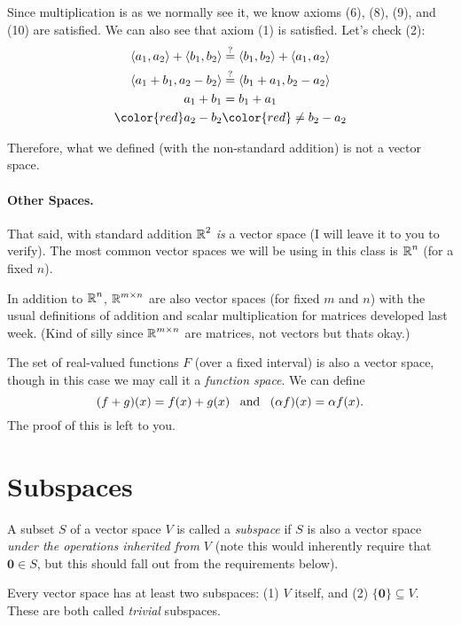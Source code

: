 Since multiplication is as we normally see it, we know axioms (6), (8), (9), and (10) are satisfied. 
We can also see that axiom (1) is satisfied.
Let's check (2): 
\[\begin{aligned}
\langle a_1,a_2\rangle + \langle b_1, b_2\rangle & \stackrel{?}{=}  \langle b_1, b_2\rangle + \langle a_1,a_2\rangle\\
\langle a_1+b_1, a_2-b_2\rangle & \stackrel{?}{=}  \langle b_1+a_1, b_2-a_2\rangle\\
a_1+b_1 & =  b_1+a_1\\
\color{red} a_2-b_2& \color{red}\ne  b_2-a_2\\
\end{aligned}\]

Therefore, what we defined (with the non-standard addition) is not a vector space. 


\paragraph{Other Spaces.} 
That said, with standard addition $\operatorname{\mathbb{R}}^2$ \emph{is} a vector space (I will leave it to you to verify).
The most common vector spaces we will be using in this class is $\operatorname{\mathbb{R}}^n$ (for a fixed $n$).

In addition to $\operatorname{\mathbb{R}}^n$, $\operatorname{\mathbb{R}}^{m\times n}$ are also vector spaces (for fixed $m$ and $n$)
with the usual definitions of addition and scalar multiplication for matrices developed last week. 
(Kind of silly since $\operatorname{\mathbb{R}}^{m\times n}$ are matrices, not vectors but thats okay.)

The set of real-valued functions $F$ (over a fixed interval) is also a vector space, 
though in this case we may call it a \emph{function space}. 
We can define 
\[(f+g)(x) = f(x) + g(x) \;\;\;\textnormal{and}\;\;\; (\alpha f)(x) = \alpha f(x).\]
The proof of this is left to you. 

\section{Subspaces}
A subset $S$ of a vector space $V$ is called a \emph{subspace} if $S$ is also a vector space \textit{under the operations inherited from $V$ } (note this would inherently require that $\mathbf{0}\in S$, but this should fall out from the requirements below).

Every vector space has at least two subspaces: (1) $V$ itself, and (2) $\{\mathbf{0}\}\subseteq V$. 
These are both called \textit{trivial} subspaces. 


